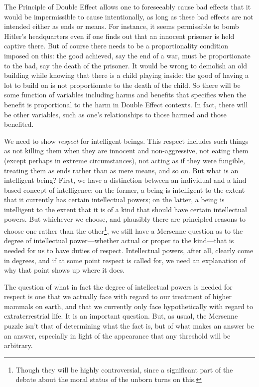 The Principle of Double Effect allows one to foreseeably cause bad effects that it would
be impermissible to cause intentionally, as long as these bad effects are not intended either as ends or means. For instance, it seems permissible to bomb Hitler's headquarters even
if one finds out that an innocent prisoner is held captive there. But of course there needs to be a proportionality
condition imposed on this: the good achieved, say the end of a war, must be proportionate to the bad, say the death of the prisoner. 
It would be wrong to demolish an old building while knowing that there is a child playing inside: the good of having a lot to build
on is not proportionate to the death of the child. So there will be some function of variables including harms and benefits that
specifies when the benefit is proportional to the harm in Double Effect contexts. In fact, there will be other variables, such as
one's relationships to those harmed and those benefited. 

We need to show \textit{respect} for intelligent beings. This respect includes such things as not killing them when they are
innocent and non-aggressive, not eating them (except perhaps in extreme circumstances), not acting as if they were fungible, treating them as ends rather than as
mere means, and so on. But what is an intelligent being? First, we have a distinction between an individual and a kind based
concept of intelligence: on the former, a being is intelligent to the extent that it currently has certain intellectual powers;
on the latter, a being is intelligent to the extent that it is of a kind that should have certain intellectual powers. But whichever we choose, and
plausibly there are principled reasons to choose one rather than the other\footnote{Though they will be highly controversial, since 
a significant part of the debate about the moral status of the unborn turns on this.}, 
we still have a Mersenne question as to the degree of intellectual power---whether actual or proper to the kind---that is 
needed for us to have duties of respect. Intellectual powers, after all, clearly come in degrees, and if at some point respect
is called for, we need an explanation of why that point shows up where it does.

The question of what in fact the degree of intellectual powers is needed for respect is one that we actually face with regard to our treatment
of higher mammals on earth, and that we currently only face hypothetically with regard to extraterrestrial life. 
It is an important question. But, as usual, the Mersenne puzzle isn't that of determining what the fact is, but of what makes 
an answer be an answer, especially in light of the appearance that any threshold will be arbitrary.

